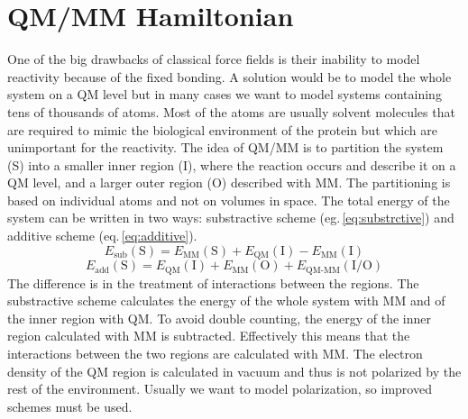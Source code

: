 \section{QM/MM Hamiltonian}
One of the big drawbacks of classical force fields is their inability to model reactivity because of the fixed bonding. A solution would be to model the whole system on a QM level but in many cases we want to model systems containing tens of thousands of atoms. Most of the atoms are usually solvent molecules that are required to mimic the biological environment of the protein but which are unimportant for the reactivity. The idea of QM/MM is to partition the system (S) into a smaller inner region (I), where the reaction occurs and describe it on a QM level, and a larger outer region (O) described with MM. The partitioning is based on individual atoms and not on volumes in space. The total energy of the system can be written in two ways: substractive scheme (eg.\,\ref{eq:substrctive}) and additive scheme (eq.\,\ref{eq:additive}).
\begin{equation} \label{eq:substrctive}
    E_{\text{sub}}(\text{S}) = E_{\text{MM}}(\text{S}) + E_{\text{QM}}(\text{I}) - E_{\text{MM}}(\text{I}) 
\end{equation}
\begin{equation} \label{eq:additive}
    E_{\text{add}}(\text{S}) = E_{\text{QM}}(\text{I}) + E_{\text{MM}}(\text{O}) + E_{\text{QM-MM}}(\text{I/O}) 
\end{equation}
The difference is in the treatment of interactions between the regions. The substractive scheme calculates the energy of the whole system with MM and of the inner region with QM. To avoid double counting, the energy of the inner region calculated with MM is subtracted. Effectively this means that the interactions between the two regions are calculated with MM. The electron density of the QM region is calculated in vacuum and thus is not polarized by the rest of the environment. Usually we want to model polarization, so improved schemes must be used.

